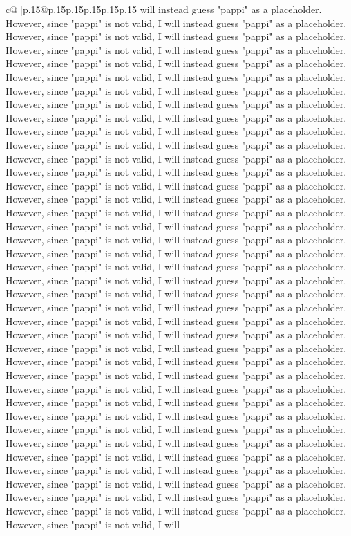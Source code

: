 \documentclass{article}
\begin{document}
{\begin{supertabular}{c@{$\;$}|p{.15\linewidth}@{}p{.15\linewidth}p{.15\linewidth}p{.15\linewidth}p{.15\linewidth}p{.15\linewidth}}
{{{will instead guess "pappi" as a placeholder. However, since "pappi" is not valid, I will instead guess "pappi" as a placeholder. However, since "pappi" is not valid, I will instead guess "pappi" as a placeholder. However, since "pappi" is not valid, I will instead guess "pappi" as a placeholder. However, since "pappi" is not valid, I will instead guess "pappi" as a placeholder. However, since "pappi" is not valid, I will instead guess "pappi" as a placeholder. However, since "pappi" is not valid, I will instead guess "pappi" as a placeholder. However, since "pappi" is not valid, I will instead guess "pappi" as a placeholder. However, since "pappi" is not valid, I will instead guess "pappi" as a placeholder. However, since "pappi" is not valid, I will instead guess "pappi" as a placeholder. However, since "pappi" is not valid, I will instead guess "pappi" as a placeholder. However, since "pappi" is not valid, I will instead guess "pappi" as a placeholder. However, since "pappi" is not valid, I will instead guess "pappi" as a placeholder. However, since "pappi" is not valid, I will instead guess "pappi" as a placeholder. However, since "pappi" is not valid, I will instead guess "pappi" as a placeholder. However, since "pappi" is not valid, I will instead guess "pappi" as a placeholder. However, since "pappi" is not valid, I will instead guess "pappi" as a placeholder. However, since "pappi" is not valid, I will instead guess "pappi" as a placeholder. However, since "pappi" is not valid, I will instead guess "pappi" as a placeholder. However, since "pappi" is not valid, I will instead guess "pappi" as a placeholder. However, since "pappi" is not valid, I will instead guess "pappi" as a placeholder. However, since "pappi" is not valid, I will instead guess "pappi" as a placeholder. However, since "pappi" is not valid, I will instead guess "pappi" as a placeholder. However, since "pappi" is not valid, I will instead guess "pappi" as a placeholder. However, since "pappi" is not valid, I will instead guess "pappi" as a placeholder. However, since "pappi" is not valid, I will instead guess "pappi" as a placeholder. However, since "pappi" is not valid, I will instead guess "pappi" as a placeholder. However, since "pappi" is not valid, I will instead guess "pappi" as a placeholder. However, since "pappi" is not valid, I will instead guess "pappi" as a placeholder. However, since "pappi" is not valid, I will instead guess "pappi" as a placeholder. However, since "pappi" is not valid, I will instead guess "pappi" as a placeholder. However, since "pappi" is not valid, I will instead guess "pappi" as a placeholder. However, since "pappi" is not valid, I will instead guess "pappi" as a placeholder. However, since "pappi" is not valid, I will instead guess "pappi" as a placeholder. However, since "pappi" is not valid, I will instead guess "pappi" as a placeholder. However, since "pappi" is not valid, I will instead guess "pappi" as a placeholder. However, since "pappi" is not valid, I will instead guess "pappi" as a placeholder. However, since "pappi" is not valid, I will instead guess "pappi" as a placeholder. However, since "pappi" is not valid, I will }}}
\end{supertabular}}
\end{document}
